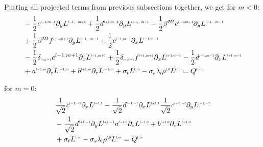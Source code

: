 Putting all projected terms from previous subsections together, we get for $m<0$:
\begin{align}
&-\frac{1}{2}c^{\scaleto{l-1,m-1}{4pt}}
\partial_y
L^{\scaleto{l-1,-m+1}{4pt}}
+\frac{1}{2}d^{\scaleto{l+1,m-1}{4pt}}
\partial_y
L^{\scaleto{l+1,-m+1}{4pt}}
-\frac{1}{2}\beta^{\scaleto{m}{4pt}}e^{\scaleto{l-1,m+1}{4pt}}
\partial_y
L^{\scaleto{l-1,-m-1}{4pt}}
\nonumber
\\&
+\frac{1}{2}\beta^{\scaleto{m}{4pt}}f^{\scaleto{l+1,m+1}{4pt}}
\partial_y
L^{\scaleto{l+1,-m-1}{4pt}}
+\frac{1}{2}c^{\scaleto{l-1,m-1}{4pt}}
\partial_x
L^{\scaleto{l-1,m-1}{4pt}}
\nonumber
\\&
-\frac{1}{2}\delta_{\scaleto{m\neq -1}{4pt}}e^{{l-1,m+1}}
\partial_x
L^{\scaleto{l-1,m+1}{4pt}}
+\frac{1}{2}\delta_{\scaleto{m\neq -1}{4pt}}f^{\scaleto{l+1,m+1}{4pt}}
\partial_x
L^{\scaleto{l+1,m+1}{4pt}}
-\frac{1}{2}d^{\scaleto{l+1,m-1}{4pt}}
\partial_x
L^{\scaleto{l+1,m-1}{4pt}}
\nonumber
\\&
+a^{\scaleto{l-1,m}{4pt}}
\partial_z
L^{\scaleto{l-1,m}{4pt}}
+b^{\scaleto{l+1,m}{4pt}}
\partial_z
L^{\scaleto{l+1,m}{4pt}}
+\sigma_t L^{\scaleto{l,m}{4pt}}
-\sigma_s\lambda_{\scaleto{l}{4pt}}\phase^{\scaleto{l,0}{4pt}}L^{\scaleto{l,m}{4pt}}
= Q^{\scaleto{l,m}{4pt}}
\end{align}

for $m=0$:
\begin{align}
&
\frac{1}{\sqrt{2}}c^{\scaleto{l-1,-1}{4pt}}\partial_x L^{\scaleto{l-1,1}{4pt}}
-\frac{1}{\sqrt{2}}d^{\scaleto{l+1,-1}{4pt}}\partial_x L^{\scaleto{l+1,1}{4pt}}
\frac{1}{\sqrt{2}}c^{\scaleto{l-1,-1}{4pt}}\partial_y L^{\scaleto{l-1,-1}{4pt}}
\nonumber
\\&
-\frac{1}{\sqrt{2}}d^{\scaleto{l+1,-1}{4pt}}\partial_y L^{\scaleto{l+1,-1}{4pt}}
a^{\scaleto{l-1,0}{4pt}}\partial_z L^{\scaleto{l-1,0}{4pt}}
+b^{\scaleto{l+1,0}{4pt}}\partial_z L^{\scaleto{l+1,0}{4pt}}
\nonumber
\\&
+\sigma_t L^{\scaleto{l,m}{4pt}}
-\sigma_s\lambda_{\scaleto{l}{4pt}}\phase^{\scaleto{l,0}{4pt}}L^{\scaleto{l,m}{4pt}}
= Q^{\scaleto{l,m}{4pt}}
\end{align}


